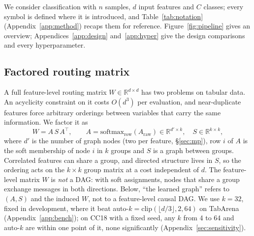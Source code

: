 \documentclass[anon,12pt]{clear2027} %
\newcommand{\R}{\mathbb{R}}
\newcommand{\T}{^{\top}}
\begin{document}
We consider classification with $n$ samples, $d$ input features and $C$ classes; every symbol is defined where it is introduced, and Table~\ref{tab:notation} (Appendix~\ref{app:method}) recaps them for reference. Figure~\ref{fig:pipeline} gives an overview; Appendices~\ref{app:design} and~\ref{app:hyper} give the design comparisons and every hyperparameter.

\subsection{Factored routing matrix}
\label{sec:factored}
A full feature-level routing matrix $W\in\R^{d\times d}$ has two problems on tabular data. An acyclicity constraint on it costs $O(d^3)$ per evaluation, and near-duplicate features force arbitrary orderings between variables that carry the same information. We factor it as
\begin{equation}
W = A\,S\,A\T,\qquad A=\mathrm{softmax}_{\text{row}}(A_{\text{raw}})\in\R^{d'\times k},\quad S\in\R^{k\times k},
\label{eq:factored}
\end{equation}
where $d'$ is the number of graph nodes (two per feature, \S\ref{sec:mp}), row $i$ of $A$ is the soft membership of node $i$ in $k$ groups and $S$ is a graph between groups. Correlated features can share a group, and directed structure lives in $S$, so the ordering acts on the $k\times k$ group matrix at a cost independent of $d$. The feature-level matrix $W$ is \emph{not} a DAG: with soft assignments, nodes that share a group exchange messages in both directions. Below, ``the learned graph'' refers to $(A,S)$ and the induced $W$, not to a feature-level causal DAG. We use $k=32$, fixed in development, where it beat auto-$k=\mathrm{clip}(\lfloor d/3\rfloor,2,64)$ on TabArena (Appendix~\ref{app:bench}); on CC18 with a fixed seed, any $k$ from 4 to 64 and auto-$k$ are within one point of it, none significantly (Appendix~\ref{sec:sensitivity}).
\end{document}
